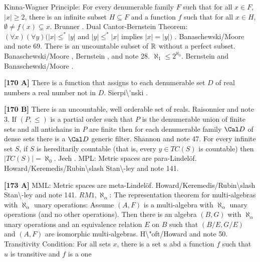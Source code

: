 Kinna-Wagner Principle:  For every denumerable family $F$ such that for
all $x\in F$, $|x|\ge 2$, there is an infinite subset $H\subseteq F$ and
a function $f$ such that for all $x\in H$, $\emptyset\neq f(x)
\subsetneq x$. \ac{Brunner} \cite{1982a}.
\medskip
{}  Dual Cantor-Bernstein Theorem: $(\forall x)
(\forall y)(|x| \le^*|y|$ and $|y|\le^* |x|$ implies  $|x| = |y|)$ .
\ac{Banaschewski/Moore} \cite{1990} and note 69.
\medskip
{} There is an uncountable subset of ${\Bbb R}$
without a perfect subset. \ac{Banaschewski/Moore} \cite{1990},
\ac{Bernstein} \cite{1908}, and note 28.
\medskip
{} $\aleph_{1}\le 2^{\aleph_{0}}$. \ac{Bernstein}
\cite{1908} and \ac{Banaschewski/Moore} \cite{1990}.
\smallskip
\item{}{\bf [170 A]}  There is a function that assigns to each  denumerable
set $D$ of real numbers a real number not in $D$.  \ac{Sierpi\'nski}
\cite{1954}.
\smallskip
\item{}{\bf [170 B]}  There is an uncountable, well orderable set of
reals.  \ac{Raisonnier} \cite{1982} and note 3.
\medskip
{} If $(P,\le)$ is a partial order such that $P$ is
the denumerable union of finite sets and all antichains in $P$ are finite
then for each denumerable family ${\Cal D}$ of dense sets there is a
${\Cal D}$ generic filter.  \ac{Shannon} \cite{1990} and note 47.
\medskip
{} For every infinite set $S$, if $S$ is hereditarily
countable  (that is, every $y\in TC(S)$ is countable) then $|TC(S)|=
\aleph_{0}$. \ac{Jech} \cite{1982}.
\medskip
{}  MPL: Metric spaces are para-Lindel\"of.
\ac{Howard/Keremedis/Rubin\slash Stan\-ley} \cite{1999} and note 141.
\smallskip
\item{}{\bf [173 A]}  MML: Metric spaces are meta-Lindel\"of.
\ac{Howard/Keremedis/Rubin\slash Stan\-ley} \cite{1999} and note 141.
\medskip
{} $RM1,\aleph_{\alpha }$: The
representation theorem for multi-algebras with $\aleph_{\alpha }$
unary operations:  Assume $(A,F)$ is  a  multi-algebra  with
$\aleph_{\alpha }$ unary operations (and no other operations).
Then  there  is  an  algebra $(B,G)$  with $\aleph_{\alpha }$
unary operations and an equivalence relation $E$ on $B$ such that
$(B/E,G/E)$ and $(A,F)$ are isomorphic multi-algebras.
\ac{H\"oft/Howard} \cite{1981} and note 50.
\medskip
{} Transitivity Condition: For all sets $x$, there is
a set $u$ abd a function $f$ such that $u$ is transitive and $f$ is a one

